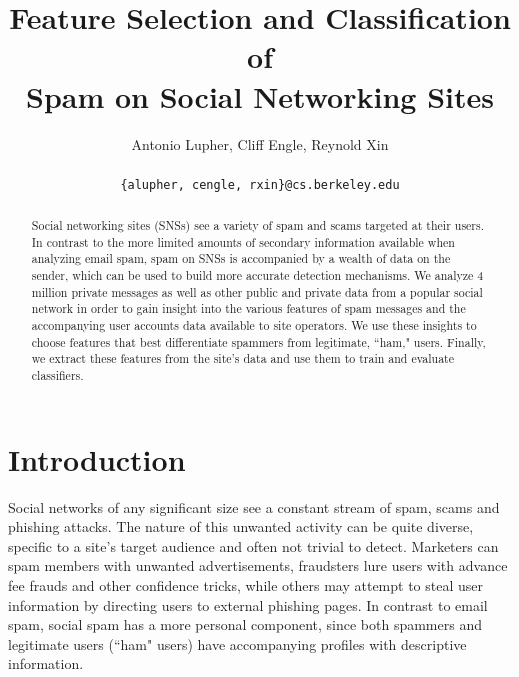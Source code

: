 \documentclass[preprint]{acm_proc_article-sp}
\begin{document}
\title{Feature Selection and Classification of \\
    Spam on Social Networking Sites}

\author{
Antonio Lupher,
Cliff Engle,
Reynold Xin\\\\
\texttt{\{alupher, cengle, rxin\}@cs.berkeley.edu}
}


\maketitle
\begin{abstract}
Social networking sites (SNSs) see a variety of spam and scams targeted at 
their users. In contrast to the more limited amounts of secondary information 
available when analyzing email spam, spam on SNSs is accompanied by a wealth 
of data on the sender, which can be used to build more accurate detection mechanisms. 
We analyze 4 million private messages as well as other public and private data from 
a popular social network in order to gain insight into the various features of 
spam messages and the accompanying user accounts data available to site operators. 
We use these insights to choose features that best differentiate spammers from 
legitimate, ``ham," users.  Finally, we extract these features from the site's data 
and use them to train and evaluate classifiers.
\end{abstract}


\maketitle

\section{Introduction}

Social networks of any significant size see a constant stream of spam, scams and phishing attacks. 
The nature of this unwanted activity can be quite diverse, specific to a site's target audience and 
often not trivial to detect. Marketers can spam members with unwanted advertisements, fraudsters 
lure users with advance fee frauds and other confidence tricks, while others may attempt to steal user
information by directing users to external phishing pages. In contrast to email spam, social spam 
has a more personal component, since both spammers and legitimate users (``ham" users) have accompanying 
profiles with descriptive information. 
\end{document}
